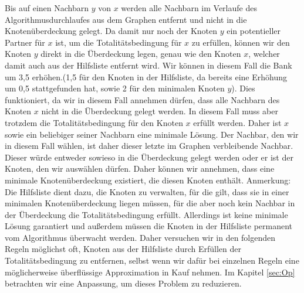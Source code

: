 \documentclass[12pt,onecolumn, notitlepage]{scrartcl}
\begin{document}
Bis auf einen Nachbarn $y$ von $x$ werden alle Nachbarn im Verlaufe des Algorithmusdurchlaufes aus dem Graphen entfernt und nicht in die Knotenüberdeckung gelegt. Da damit nur noch der Knoten $y$ ein potentieller Partner für $x$ ist, um die Totalitätsbedingung für $x$ zu erfüllen, können wir den Knoten $y$ direkt in die Überdeckung legen, genau wie den Knoten $x$, welcher damit auch aus der Hilfsliste entfernt wird. Wir können in diesem Fall die Bank um 3,5 erhöhen.(1,5 für den Knoten in der Hilfsliste, da bereits eine Erhöhung um 0,5 stattgefunden hat, sowie 2 für den minimalen Knoten $y$). Dies funktioniert, da wir in diesem Fall annehmen dürfen, dass alle Nachbarn des Knoten $x$ nicht in die Überdeckung gelegt werden. In diesem Fall muss aber trotzdem die Totalitätsbedingung für den Knoten $x$ erfüllt werden. Daher ist $x$ sowie ein beliebiger seiner Nachbarn eine minimale Lösung. Der Nachbar, den wir in diesem Fall wählen, ist daher dieser letzte im Graphen verbleibende Nachbar. Dieser würde entweder sowieso in die Überdeckung gelegt werden oder er ist der Knoten, den wir auswählen dürfen. Daher können wir annehmen, dass eine minimale Knotenüberdeckung existiert, die diesen Knoten enthält.\newline
Anmerkung: Die Hilfsliste dient dazu, die Knoten zu verwalten, für die gilt, dass sie in einer minimalen Knotenüberdeckung liegen müssen, für die aber noch kein Nachbar in der Überdeckung die Totalitätsbedingung erfüllt. Allerdings ist keine minimale Lösung garantiert und außerdem müssen die Knoten in der Hilfsliste permanent vom Algorithmus überwacht werden. Daher versuchen wir in den folgenden Regeln möglichst oft, Knoten aus der Hilfsliste durch Erfüllen der Totalitätsbedingung zu entfernen, selbst wenn wir dafür bei einzelnen Regeln eine möglicherweise überflüssige Approximation in Kauf nehmen. Im Kapitel \ref{sec:Op} betrachten wir eine Anpassung, um dieses Problem zu reduzieren.
\end{document}

